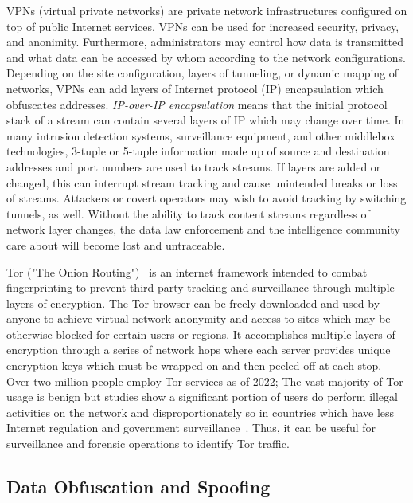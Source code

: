 VPNs (virtual private networks) are private network infrastructures configured on top of public Internet services. VPNs can be used for increased security, privacy, and anonimity. Furthermore, administrators may control how data is transmitted and what data can be accessed by whom according to the network configurations. Depending on the site configuration, layers of tunneling, or dynamic mapping of networks, VPNs can add layers of Internet protocol (IP) encapsulation which obfuscates addresses. \textit{IP-over-IP encapsulation} means that the initial protocol stack of a stream can contain several layers of IP which may change over time. In many intrusion detection systems, surveillance equipment, and other middlebox technologies, 3-tuple or 5-tuple information made up of source and destination addresses and port numbers are used to track streams. If layers are added or changed, this can interrupt stream tracking and cause unintended breaks or loss of streams. Attackers or covert operators may wish to avoid tracking by switching tunnels, as well. Without the ability to track content streams regardless of network layer changes, the data law enforcement and the intelligence community care about will become lost and untraceable.

Tor ("The Onion Routing")~\cite{tor} is an internet framework intended to combat fingerprinting to prevent third-party tracking and surveillance through multiple layers of encryption. The Tor browser can be freely downloaded and used by anyone to achieve virtual network anonymity and access to sites which may be otherwise blocked for certain users or regions. It accomplishes multiple layers of encryption through a series of network hops where each server provides unique encryption keys which must be wrapped on and then peeled off at each stop. Over two million people employ Tor services as of 2022; The vast majority of Tor usage is benign but studies show a significant portion of users do perform illegal activities on the network and disproportionately so in countries which have less Internet regulation and government surveillance~\cite{Jardine2020ThePH}. Thus, it can be useful for surveillance and forensic operations to identify Tor traffic.

\subsection{Data Obfuscation and Spoofing}

